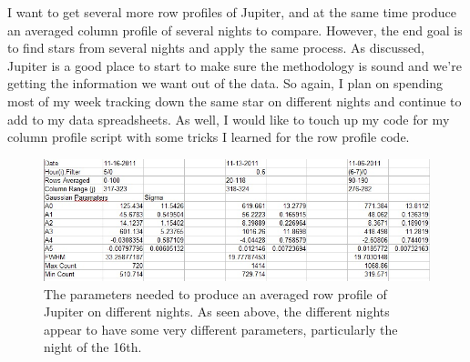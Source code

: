 \documentclass[11pt]{article}
\begin{document}
I want to get several more row profiles of Jupiter, and at the same time produce an averaged column profile of several nights to compare. However, the end goal is to find stars from several nights and apply the same process. As discussed, Jupiter is a good place to start to make sure the methodology is sound and we're getting the information we want out of the data. So again, I plan on spending most of my week tracking down the same star on different nights and continue to add to my data spreadsheets. As well, I would like to touch up my code for my column profile script with some tricks I learned for the row profile code.

\begin{figure}[t]
\includegraphics[scale=0.8]{jupiter_spreadsheet.jpg}
\caption{The parameters needed to produce an averaged row profile of Jupiter on different nights. As seen above, the different nights appear to have some very different parameters, particularly the night of the 16th.}
\end{figure}
\end{document}
